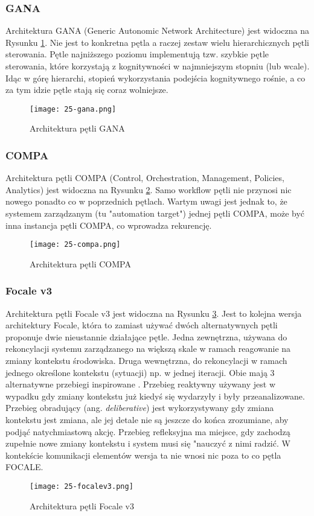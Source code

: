 \subsubsection{GANA}
Architektura GANA (Generic Autonomic Network Architecture) \cite{etsigana2018} jest widoczna na Rysunku \ref{fig:25-gana}. Nie jest to konkretna pętla a raczej zestaw wielu hierarchicznych pętli sterowania. Pętle najniższego poziomu implementują tzw. szybkie pętle sterowania, które korzystają z kognitywności w najmniejszym stopniu (lub wcale). Idąc w górę hierarchi, stopień wykorzystania podejścia kognitywnego rośnie, a co za tym idzie pętle stają się coraz wolniejsze. 

\begin{figure}[!h]
    \centering \texttt{[image: 25-gana.png]}
    \caption{Architektura pętli GANA}\label{fig:25-gana}
\end{figure}

\subsubsection{COMPA}
Architektura pętli COMPA (Control, Orchestration, Management, Policies, Analytics) \cite{doyle2014} jest widoczna na Rysunku \ref{fig:25-compa}. Samo workflow pętli nie przynosi nic nowego ponadto co w poprzednich pętlach. Wartym uwagi jest jednak to, że systemem zarządzanym (tu "automation target") jednej pętli COMPA, może być inna instancja pętli COMPA, co wprowadza rekurencję. 

\begin{figure}[!h]
    \centering \texttt{[image: 25-compa.png]}
    \caption{Architektura pętli COMPA}\label{fig:25-compa}
\end{figure}

\subsubsection{Focale v3}
Architektura pętli Focale v3 \cite{strassner2009} jest widoczna na Rysunku \ref{fig:25-focalev3}. Jest to kolejna wersja architektury Focale, która to zamiast używać dwóch alternatywnych pętli proponuje dwie nieustannie działające pętle. Jedna zewnętrzna, używana do rekoncylacji systemu zarządzanego na większą skale w ramach reagowanie na zmiany kontekstu środowiska. Druga wewnętrzna, do rekoncylacji w ramach jednego określone kontekstu (sytuacji) np. w jednej iteracji. Obie mają 3 alternatywne przebiegi inspirowane \cite{minsky1986}. Przebieg reaktywny używany jest w wypadku gdy zmiany kontekstu już kiedyś się wydarzyły i były przeanalizowane. Przebieg obradujący (ang. \textit{deliberative}) jest wykorzystywany gdy zmiana kontekstu jest zmiana, ale jej detale nie są jeszcze do końca zrozumiane, aby podjąć natychmiastową akcję. Przebieg refleksyjna ma miejsce, gdy zachodzą zupełnie nowe zmiany kontekstu i system musi się "nauczyć z nimi radzić. W kontekście komunikacji elementów wersja ta nie wnosi nic poza to co pętla FOCALE.

\begin{figure}[!h]
    \centering \texttt{[image: 25-focalev3.png]}
    \caption{Architektura pętli Focale v3}\label{fig:25-focalev3}
\end{figure}
